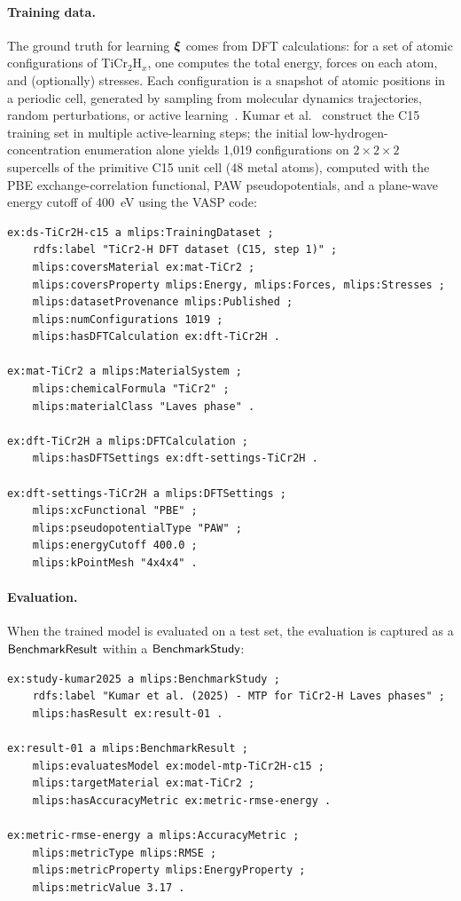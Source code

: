 \paragraph{Training data.}
The ground truth for learning $\boldsymbol{\xi}$ comes from DFT calculations:
for a set of atomic configurations of TiCr$_2$H$_x$, one computes the
total energy, forces on each atom, and (optionally) stresses. Each
configuration is a snapshot of atomic positions in a periodic cell,
generated by sampling from molecular dynamics trajectories, random
perturbations, or active learning~\cite{novikov2021mlip}. Kumar et
al.~\cite{kumar2025ticr2h} construct the C15 training set in
multiple active-learning steps; the initial low-hydrogen-concentration
enumeration alone yields 1{,}019 configurations on
$2 \times 2 \times 2$ supercells of the primitive C15 unit cell (48 metal atoms),
computed with the PBE exchange-correlation functional, PAW
pseudopotentials, and a plane-wave energy cutoff of 400~eV using the
VASP code:
%
\begin{lstlisting}[language=turtle,caption={Training dataset and DFT settings.},label=lst:training-data]
ex:ds-TiCr2H-c15 a mlips:TrainingDataset ;
    rdfs:label "TiCr2-H DFT dataset (C15, step 1)" ;
    mlips:coversMaterial ex:mat-TiCr2 ;
    mlips:coversProperty mlips:Energy, mlips:Forces, mlips:Stresses ;
    mlips:datasetProvenance mlips:Published ;
    mlips:numConfigurations 1019 ;
    mlips:hasDFTCalculation ex:dft-TiCr2H .

ex:mat-TiCr2 a mlips:MaterialSystem ;
    mlips:chemicalFormula "TiCr2" ;
    mlips:materialClass "Laves phase" .

ex:dft-TiCr2H a mlips:DFTCalculation ;
    mlips:hasDFTSettings ex:dft-settings-TiCr2H .

ex:dft-settings-TiCr2H a mlips:DFTSettings ;
    mlips:xcFunctional "PBE" ;
    mlips:pseudopotentialType "PAW" ;
    mlips:energyCutoff 400.0 ;
    mlips:kPointMesh "4x4x4" .
\end{lstlisting}

\paragraph{Evaluation.}
When the trained model is evaluated on a test set, the evaluation is
captured as a $\mathsf{BenchmarkResult}$ within a $\mathsf{BenchmarkStudy}$:
%
\begin{lstlisting}[language=turtle,caption={Benchmark study and evaluation result.},label=lst:benchmark]
ex:study-kumar2025 a mlips:BenchmarkStudy ;
    rdfs:label "Kumar et al. (2025) - MTP for TiCr2-H Laves phases" ;
    mlips:hasResult ex:result-01 .

ex:result-01 a mlips:BenchmarkResult ;
    mlips:evaluatesModel ex:model-mtp-TiCr2H-c15 ;
    mlips:targetMaterial ex:mat-TiCr2 ;
    mlips:hasAccuracyMetric ex:metric-rmse-energy .

ex:metric-rmse-energy a mlips:AccuracyMetric ;
    mlips:metricType mlips:RMSE ;
    mlips:metricProperty mlips:EnergyProperty ;
    mlips:metricValue 3.17 .
\end{lstlisting}

